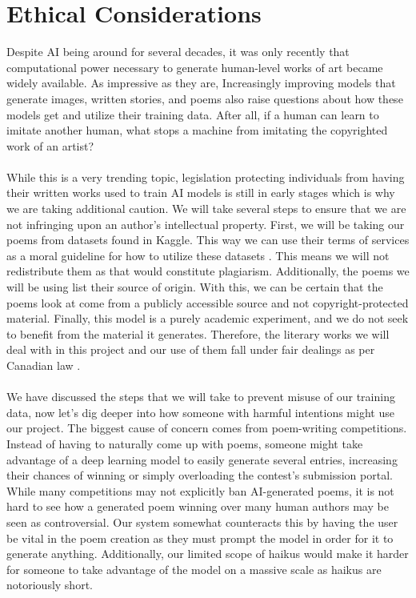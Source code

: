 \documentclass{article} %
\begin{document}
\section{Ethical Considerations}
Despite AI being around for several decades, it was only recently that computational power necessary to generate human-level works of art became widely available. As impressive as they are, Increasingly improving models that generate images, written stories, and poems also raise questions about how these models get and utilize their training data. After all, if a human can learn to imitate another human, what stops a machine from imitating the copyrighted work of an artist?\\\\

While this is a very trending topic, legislation protecting individuals from having their written works used to train AI models is still in early stages which is why we are taking additional caution. We will take several steps to ensure that we are not infringing upon an author’s intellectual property. First, we will be taking our poems from datasets found in Kaggle. This way we can use their terms of services as a moral guideline for how to utilize these datasets \citep{Kaggle_2024}. This means we will not redistribute them as that would constitute plagiarism. Additionally, the poems we will be using list their source of origin. With this, we can be certain that the poems look at come from a publicly accessible source and not copyright-protected material. Finally, this model is a purely academic experiment, and we do not seek to benefit from the material it generates. Therefore, the literary works we will deal with in this project and our use of them fall under fair dealings as per Canadian law \citep{LegislativeServicesBranch_2024}.\\\\

We have discussed the steps that we will take to prevent misuse of our training data, now let’s dig deeper into how someone with harmful intentions might use our project. The biggest cause of concern comes from poem-writing competitions. Instead of having to naturally come up with poems, someone might take advantage of a deep learning model to easily generate several entries, increasing their chances of winning or simply overloading the contest’s submission portal. While many competitions may not explicitly ban AI-generated poems, it is not hard to see how a generated poem winning over many human authors may be seen as controversial. Our system somewhat counteracts this by having the user be vital in the poem creation as they must prompt the model in order for it to generate anything. Additionally, our limited scope of haikus would make it harder for someone to take advantage of the model on a massive scale as haikus are notoriously short.
\end{document}
